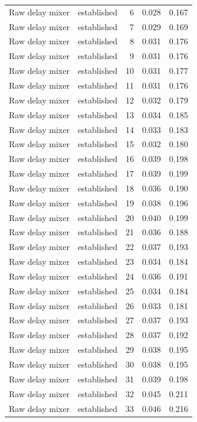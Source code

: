 \begin{tabular}{llrrr}
Raw delay mixer & established & 6 & 0.028 & 0.167 \\
Raw delay mixer & established & 7 & 0.029 & 0.169 \\
Raw delay mixer & established & 8 & 0.031 & 0.176 \\
Raw delay mixer & established & 9 & 0.031 & 0.176 \\
Raw delay mixer & established & 10 & 0.031 & 0.177 \\
Raw delay mixer & established & 11 & 0.031 & 0.176 \\
Raw delay mixer & established & 12 & 0.032 & 0.179 \\
Raw delay mixer & established & 13 & 0.034 & 0.185 \\
Raw delay mixer & established & 14 & 0.033 & 0.183 \\
Raw delay mixer & established & 15 & 0.032 & 0.180 \\
Raw delay mixer & established & 16 & 0.039 & 0.198 \\
Raw delay mixer & established & 17 & 0.039 & 0.199 \\
Raw delay mixer & established & 18 & 0.036 & 0.190 \\
Raw delay mixer & established & 19 & 0.038 & 0.196 \\
Raw delay mixer & established & 20 & 0.040 & 0.199 \\
Raw delay mixer & established & 21 & 0.036 & 0.188 \\
Raw delay mixer & established & 22 & 0.037 & 0.193 \\
Raw delay mixer & established & 23 & 0.034 & 0.184 \\
Raw delay mixer & established & 24 & 0.036 & 0.191 \\
Raw delay mixer & established & 25 & 0.034 & 0.184 \\
Raw delay mixer & established & 26 & 0.033 & 0.181 \\
Raw delay mixer & established & 27 & 0.037 & 0.193 \\
Raw delay mixer & established & 28 & 0.037 & 0.192 \\
Raw delay mixer & established & 29 & 0.038 & 0.195 \\
Raw delay mixer & established & 30 & 0.038 & 0.195 \\
Raw delay mixer & established & 31 & 0.039 & 0.198 \\
Raw delay mixer & established & 32 & 0.045 & 0.211 \\
Raw delay mixer & established & 33 & 0.046 & 0.216 \\

\end{tabular}
